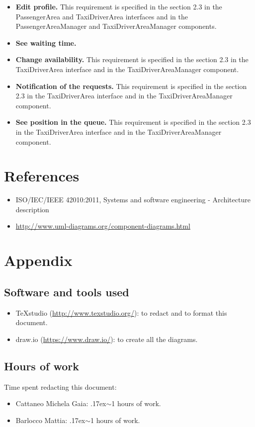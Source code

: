 \documentclass[18pt,oneside,a4paper, titlepage]{article}
\begin{document}
\begin{itemize}
			\item \textbf{Edit profile.} This requirement is specified in the section 2.3 in the PassengerArea and TaxiDriverArea interfaces and in the PassengerAreaManager and TaxiDriverAreaManager components.
			
			\item \textbf{See waiting time.}
			
			\item \textbf{Change availability.} This requirement is specified in the section 2.3 in the TaxiDriverArea interface and in the TaxiDriverAreaManager component.
			
			\item \textbf{Notification of the requests.} This requirement is specified in the section 2.3 in the TaxiDriverArea interface and in the TaxiDriverAreaManager component.
			
			\item \textbf{See position in the queue.} This requirement is specified in the section 2.3 in the TaxiDriverArea interface and in the TaxiDriverAreaManager component.
		\end{itemize}
\newpage
	\section{References}
		\begin{itemize}
			\item  ISO/IEC/IEEE 42010:2011, Systems and software engineering - Architecture description
			\item \url{http://www.uml-diagrams.org/component-diagrams.html}
		\end{itemize}
\newpage
	\section{Appendix}
		\subsection{Software and tools used}
				\begin{itemize}
					\item TeXstudio (\url{http://www.texstudio.org/}): to redact and to format this document.
					\item draw.io (\url{https://www.draw.io/}): to create all the diagrams.
				\end{itemize}
		\subsection{Hours of work}
			Time spent redacting this document:
			\begin{itemize}
				\item Cattaneo Michela Gaia: {\raise.17ex\hbox{$\scriptstyle\sim$}}1 hours of work.
				\item Barlocco Mattia: {\raise.17ex\hbox{$\scriptstyle\sim$}}1 hours of work.
			\end{itemize}
		
		
		
\end{document}
